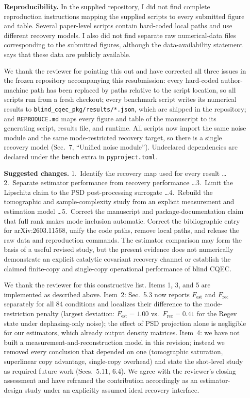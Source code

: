 \documentclass[11pt,a4paper]{article}
\newcommand{\rev}[1]{{\color{black}#1}}
\newcommand{\resp}[1]{{\color{red}#1}}
\newcommand{\Frec}{F_\mathrm{rec}}
\newcommand{\Fest}{F_\mathrm{est}}
\begin{document}
\rev{\textbf{Reproducibility.} In the supplied repository, I did not find complete reproduction instructions mapping the supplied scripts to every submitted figure and table. Several paper-level scripts contain hard-coded local paths and use different recovery models. I also did not find separate raw numerical-data files corresponding to the submitted figures, although the data-availability statement says that these data are publicly available.}

\resp{We thank the reviewer for pointing this out and have corrected all three issues in the frozen repository accompanying this resubmission: every hard-coded author-machine path has been replaced by paths relative to the script location, so all scripts run from a fresh checkout; every benchmark script writes its numerical results to \texttt{blind\_cqec\_pkg/results/*.json}, which are shipped in the repository; and \texttt{REPRODUCE.md} maps every figure and table of the manuscript to its generating script, results file, and runtime. All scripts now import the same noise module and the same mode-restricted recovery target, so there is a single recovery model (Sec.~7, ``Unified noise module''). Undeclared dependencies are declared under the \texttt{bench} extra in \texttt{pyproject.toml}.}

\rev{\textbf{Suggested changes.} 1.~Identify the recovery map used for every result \ldots 2.~Separate estimator performance from recovery performance \ldots 3.~Limit the Lipschitz claim to the PSD post-processing surrogate \ldots 4.~Rebuild the tomographic and sample-complexity study from an explicit measurement and estimation model \ldots 5.~Correct the manuscript and package-documentation claim that full rank makes mode inclusion automatic. Correct the bibliographic entry for arXiv:2603.11568, unify the code paths, remove local paths, and release the raw data and reproduction commands. The estimator comparison may form the basis of a useful revised study, but the present evidence does not numerically demonstrate an explicit catalytic covariant recovery channel or establish the claimed finite-copy and single-copy operational performance of blind CQEC.}

\resp{We thank the reviewer for this constructive list. Items 1, 3, and 5 are implemented as described above. Item~2: Sec.~5.3 now reports $\Fest$ and $\Frec$ separately for all 84 conditions and localizes their difference to the mode-restriction penalty (largest deviation: $\Fest = 1.00$ vs.\ $\Frec = 0.41$ for the Regev state under dephasing-only noise); the effect of PSD projection alone is negligible for our estimators, which already output density matrices. Item~4: we have not built a measurement-and-reconstruction model in this revision; instead we removed every conclusion that depended on one (tomographic saturation, superlinear copy advantage, single-copy overhead) and state the shot-level study as required future work (Secs.~5.11, 6.4). We agree with the reviewer's closing assessment and have reframed the contribution accordingly as an estimator-design study under an explicitly assumed ideal recovery interface.}
\end{document}
